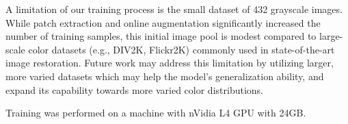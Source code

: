 A limitation of our training process is the small dataset of 432 grayscale images. While patch extraction and online augmentation significantly increased the number of training samples, this initial image pool is modest compared to large-scale color datasets (e.g., DIV2K, Flickr2K) commonly used in state-of-the-art image restoration. Future work may address this limitation by utilizing larger, more varied datasets which may help the model's generalization ability, and expand its capability towards more varied color distributions.

Training was performed on a machine with nVidia L4 GPU with 24GB.
